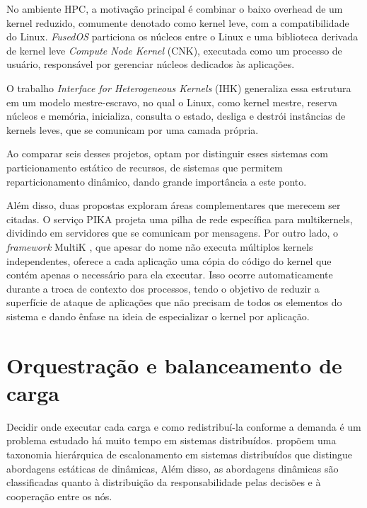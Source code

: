 No ambiente HPC, a motivação principal é combinar o baixo overhead de um kernel reduzido, comumente denotado como kernel leve, com a compatibilidade do Linux.
\textit{FusedOS} \citep{park2012fusedos} particiona os núcleos entre o Linux e uma biblioteca derivada de kernel leve \textit{Compute Node Kernel} (CNK), executada
como um processo de usuário, responsável por gerenciar núcleos dedicados às aplicações.

O trabalho \textit{Interface for Heterogeneous Kernels} (IHK) \citep{shimosawa2014ihk} generaliza essa estrutura em um modelo mestre-escravo,
no qual o Linux, como kernel mestre, reserva núcleos e memória, inicializa, consulta o estado, desliga e destrói instâncias
de kernels leves, que se comunicam por uma camada própria.

Ao comparar seis desses projetos, \citet{gerofi2016survey} optam por distinguir esses sistemas com particionamento estático de recursos,
de sistemas que permitem reparticionamento dinâmico, dando grande importância a este ponto.

Além disso, duas propostas exploram áreas complementares que merecem ser citadas.
O serviço PIKA \citep{beckmann2014pika} projeta uma pilha de rede específica para multikernels, dividindo em servidores que se comunicam por mensagens.
Por outro lado, o \textit{framework} MultiK \citep{kuo2019multik}, que apesar do nome não executa múltiplos kernels independentes, oferece a
cada aplicação uma cópia do código do kernel que contém apenas o necessário para ela executar.
Isso ocorre automaticamente durante a troca de contexto dos processos, tendo o objetivo de reduzir a superfície de ataque de
aplicações que não precisam de todos os elementos do sistema e dando ênfase na ideia de especializar o kernel por aplicação.

\section{Orquestração e balanceamento de carga}
\label{sec:rel-orquestracao}

Decidir onde executar cada carga e como redistribuí-la conforme a demanda é um problema estudado há muito tempo em sistemas distribuídos.
\citet{casavant1988taxonomy} propõem uma taxonomia hierárquica de escalonamento em sistemas distribuídos que distingue abordagens estáticas de dinâmicas,
Além disso, as abordagens dinâmicas são classificadas quanto à distribuição da responsabilidade pelas decisões e à cooperação entre os nós.

